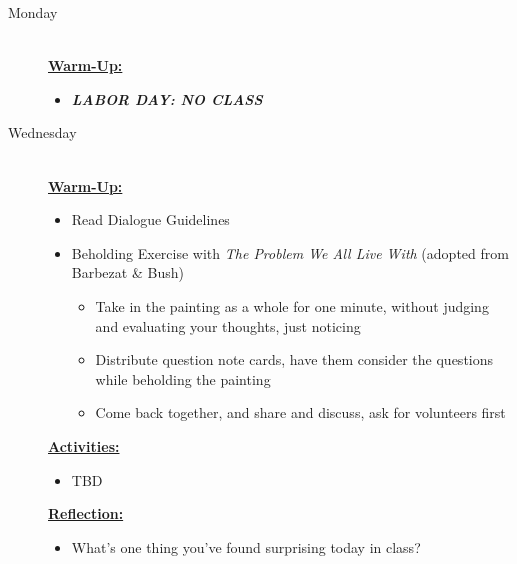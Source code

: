 \documentclass{article}
\newcommand{\listmon}{\item[\large\textsf{Monday}\normalsize] \hfill \\}
\newcommand{\listwed}{\item[\large\textsf{Wednesday}\normalsize] \hfill \\}
\newenvironment{daywu}
	{\underline{\textbf{Warm-Up:}} \hfill \\
	\begin{itemize}}
	{\end{itemize}}
\newenvironment{dayact}
	{\underline{\textbf{Activities:}} \hfill \\
	\begin{itemize}}
	{\end{itemize}}
\newenvironment{dayref}
	{\underline{\textbf{Reflection:}} \hfill \\
	\begin{itemize}}
	{\end{itemize}}
\newenvironment{weeksched}
	{\noindent
	\begin{description}}
	{\end{description}
	\newpage}
\begin{document}
\begin{weeksched}

\listmon
\begin{daywu}
	\item \textbf{\textit{LABOR DAY: NO CLASS}}
\end{daywu}

\listwed
\begin{daywu}
	\item Read Dialogue Guidelines
	\item Beholding Exercise with \textit{The Problem We All Live With} (adopted from Barbezat \& Bush)
	\begin{itemize}
		\item Take in the painting as a whole for one minute, without judging and evaluating your thoughts, just noticing
		\item Distribute question note cards, have them consider the questions while beholding the painting
		\item Come back together, and share and discuss, ask for volunteers first
	\end{itemize}
\end{daywu}
\begin{dayact}
	\item TBD
\end{dayact}
\begin{dayref}
	\item What's one thing you've found surprising today in class?
\end{dayref}
\end{weeksched}
\end{document}
